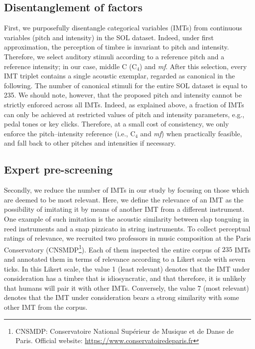 \documentclass{bmcart}
\makeatletter
\newcommand*{\eg}{e.g.,\@\xspace}
\newcommand*{\ie}{i.e.,\@\xspace}
\makeatother
\begin{document}
\subsection*{Disentanglement of factors}
First, we purposefully disentangle categorical variables (IMTs) from continuous variables (pitch and intensity) in the SOL dataset.
Indeed, under first approximation, the perception of timbre is invariant to pitch and intensity.
Therefore, we select auditory stimuli according to a reference pitch and a reference intensity; in our case, middle C ($\mathrm{C_4}$) and \emph{mf}.
After this selection, every IMT triplet contains a single acoustic exemplar, regarded as canonical in the following.
The number of canonical stimuli for the entire SOL dataset is equal to 235.
We should note, however, that the proposed pitch and intensity cannot be strictly enforced across all IMTs.
Indeed, as explained above, a fraction of IMTs can only be achieved at restricted values of pitch and intensity parameters, \eg{} pedal tones or key clicks.
Therefore, at a small cost of consistency, we only enforce the pitch--intensity reference (\ie{} $\mathrm{C_4}$ and \emph{mf}) when practically feasible, and fall back to other pitches and intensities if necessary.


\subsection*{Expert pre-screening}
Secondly, we reduce the number of IMTs in our study by focusing on those which are deemed to be most relevant.
Here, we define the relevance of an IMT as the possibility of imitating it by means of another IMT from a different instrument.
One example of such imitation is the acoustic similarity between slap tonguing in reed instruments and a snap pizzicato in string instruments.
To collect perceptual ratings of relevance, we recruited two professors in music composition at the Paris Conservatory (CNSMDP\footnote{CNSMDP: Conservatoire National Sup\'erieur de Musique et de Danse de Paris. Official website: \url{https://www.conservatoiredeparis.fr}}).
Each of them inspected the entire corpus of $235$ IMTs and annotated them in terms of relevance according to a Likert scale with seven ticks.
In this Likert scale, the value 1 (least relevant) denotes that the IMT under consideration has a timbre that is idiosyncratic, and that therefore, it is unlikely that humans will pair it with other IMTs.
Conversely, the value 7 (most relevant) denotes that the IMT under consideration bears a strong similarity with some other IMT from the corpus.
\end{document}
